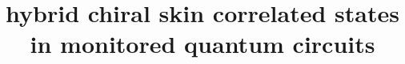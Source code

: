 \documentclass[longbibliography, aps, prx, amsmath, amssymb, amsfonts, twocolumn,superscriptaddress, footinbib]{revtex4-1}
\begin{document}
	
	
	\title{hybrid chiral skin correlated states in monitored quantum circuits}

	


\end{document}

